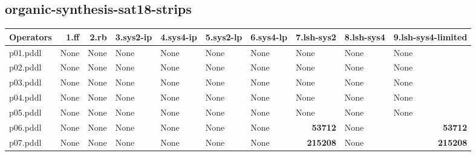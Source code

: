 \documentclass{article}
\begin{document}
\hypertarget{operators-organic-synthesis-sat18-strips}{}
\subsection*{organic-synthesis-sat18-strips}

\begin{tabular}{@{}lrrrrrrrrr@{}}
Operators & 1.ff & 2.rb & 3.sys2-ip & 4.sys4-ip & 5.sys2-lp & 6.sys4-lp & 7.lsh-sys2 & 8.lsh-sys4 & 9.lsh-sys4-limited \\
\midrule
p01.pddl & \multicolumn{1}{|l|}{None} & \multicolumn{1}{|l|}{None} & \multicolumn{1}{|l|}{None} & \multicolumn{1}{|l|}{None} & \multicolumn{1}{|l|}{None} & \multicolumn{1}{|l|}{None} & \multicolumn{1}{|l|}{None} & \multicolumn{1}{|l|}{None} & \multicolumn{1}{|l|}{None} \\
p02.pddl & \multicolumn{1}{|l|}{None} & \multicolumn{1}{|l|}{None} & \multicolumn{1}{|l|}{None} & \multicolumn{1}{|l|}{None} & \multicolumn{1}{|l|}{None} & \multicolumn{1}{|l|}{None} & \multicolumn{1}{|l|}{None} & \multicolumn{1}{|l|}{None} & \multicolumn{1}{|l|}{None} \\
p03.pddl & \multicolumn{1}{|l|}{None} & \multicolumn{1}{|l|}{None} & \multicolumn{1}{|l|}{None} & \multicolumn{1}{|l|}{None} & \multicolumn{1}{|l|}{None} & \multicolumn{1}{|l|}{None} & \multicolumn{1}{|l|}{None} & \multicolumn{1}{|l|}{None} & \multicolumn{1}{|l|}{None} \\
p04.pddl & \multicolumn{1}{|l|}{None} & \multicolumn{1}{|l|}{None} & \multicolumn{1}{|l|}{None} & \multicolumn{1}{|l|}{None} & \multicolumn{1}{|l|}{None} & \multicolumn{1}{|l|}{None} & \multicolumn{1}{|l|}{None} & \multicolumn{1}{|l|}{None} & \multicolumn{1}{|l|}{None} \\
p05.pddl & \multicolumn{1}{|l|}{None} & \multicolumn{1}{|l|}{None} & \multicolumn{1}{|l|}{None} & \multicolumn{1}{|l|}{None} & \multicolumn{1}{|l|}{None} & \multicolumn{1}{|l|}{None} & \multicolumn{1}{|l|}{None} & \multicolumn{1}{|l|}{None} & \multicolumn{1}{|l|}{None} \\
p06.pddl & \multicolumn{1}{|l|}{None} & \multicolumn{1}{|l|}{None} & \multicolumn{1}{|l|}{None} & \multicolumn{1}{|l|}{None} & \multicolumn{1}{|l|}{None} & \multicolumn{1}{|l|}{None} & \textbf{53712} & \multicolumn{1}{|l|}{None} & \textbf{53712} \\
p07.pddl & \multicolumn{1}{|l|}{None} & \multicolumn{1}{|l|}{None} & \multicolumn{1}{|l|}{None} & \multicolumn{1}{|l|}{None} & \multicolumn{1}{|l|}{None} & \multicolumn{1}{|l|}{None} & \textbf{215208} & \multicolumn{1}{|l|}{None} & \textbf{215208} \\

\end{tabular}
\end{document}
